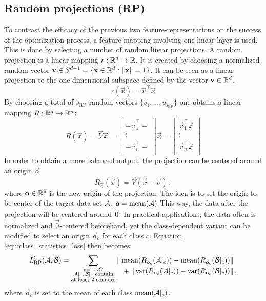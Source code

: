 \subsection{Random projections (RP)}
To contrast the efficacy of the previous two feature-representations on the success of the optimization process,
a feature-mapping involving one linear layer is used. This is done by selecting a number of  random linear projections.
A random projection is a linear mapping $r: \mathbb{R}^d \to \mathbb{R}$.
It is created by choosing a normalized random vector $\mathbf v \in S^{d-1} = \{\mathbf x \in \mathbb{R}^d : \|\mathbf x\| = 1\}$.
It can be seen as a linear projection to the one-dimensional subspace defined by the vector $\mathbf v \in \mathbb{R}^d$.
\[
    r(\vec x) = \vec v ^\top \vec x
\]
By choosing a total of $s_\text{RP}$ random vectors $\{v_1, \dots, v_{s_\text{RP}}\}$ one obtains a linear mapping $R: \mathbb{R}^d \to \mathbb{R}^n$:
\[
    R(\vec x) = \vec V \vec x =
    \begin{bmatrix}
        - \vec v_1 ^\top - \\
        \vdots \\
        - \vec v_n ^\top - \\
    \end{bmatrix}
    \vec x =
    \begin{bmatrix}
        \vec v_1 ^\top \vec x \\
        \vdots \\
        \vec v_n ^\top \vec x \\
    \end{bmatrix}
\]
%
In order to obtain a more balanced output,
the projection can be centered around an origin $\vec o$.
% 
\[
    R_{\vec o} (\vec x) = \vec V (\vec x - \vec o) \,,
\]
where $\mathbf o \in \mathbb{R}^d$ is the new origin of the projection. 
The idea is to set the origin to be center of the target data set $\mathcal A$. $\mathbf o = \operatorname{mean} (\mathcal A)$
This way, the data after the projection will be centered around $\vec 0$.
In practical applications, the data often is normalized and $\vec 0$-centered beforehand,
yet the class-dependent variant can be modified to select an origin $\vec o_c$ for each class $c$.
Equation \ref{eqn:class_statistics_loss} then becomes:
% 
\begin{equation*}
    \textit{L} _{\text{RP}} ^{\mathcal C} (\mathcal A, \mathcal B) =
    \sum _{\substack{c = 1 \dots C \\ \mathcal A|_c,\, \mathcal B|_c \text{ contain} \\ \text{at least 2 samples}}}
    \begin{alignedat}[t]{1}
        \|\operatorname{mean} ({R_{\mathbf o_c} (\mathcal A|_c)}) - \operatorname{mean} ({R_{\mathbf o_c} (\mathcal B|_c)}) &\| \\
        {} + \|\operatorname{var} ({R_{\mathbf o_c} (\mathcal A|_c)}) - \operatorname{var} ({R_{\mathbf o_c} (\mathcal B|_c)}) &\|  \,,
    \end{alignedat}
\end{equation*}
%
where $\vec o_c$ is set to the mean of each class $\operatorname{mean} ({\mathcal A|_c})$.


